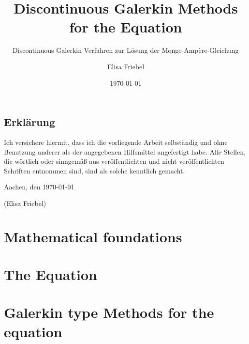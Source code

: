 \documentclass{template}
\title{Discontinuous Galerkin Methods for the \MA Equation}
\subtitle{\Large Discontinuous Galerkin Verfahren zur Lösung der Monge-Amp\`ere-Gleichung}
\author{Elisa Friebel} %
\date{\today}
\begin{document}
\maketitle

\begin{center}
\begin{minipage}[t]{0.8\textwidth}

\chapter*{Erklärung}
Ich versichere hiermit, dass ich die vorliegende Arbeit selbständig und
ohne Benutzung anderer als der angegebenen Hilfsmittel angefertigt habe.
Alle Stellen, die wörtlich oder sinngemäß aus veröffentlichten und nicht
veröffentlichten Schriften entnommen sind, sind als solche kenntlich
gemacht.

\vspace{1cm}
Aachen, den \today

\vspace{2cm}
(Elisa Friebel)
\end{minipage}
\end{center}
\thispagestyle{empty}
\cleardoublepage

\tableofcontents{}

\setcounter{page}{1}



\chapter{Mathematical foundations}
\label{ch:TheoreticalBackground}



\chapter{The \MA Equation}
\label{ch:MongeAmpereEq}



\chapter{Galerkin type Methods for the \MA equation}
\label{ch:DGMongeAmpere}

\end{document}

